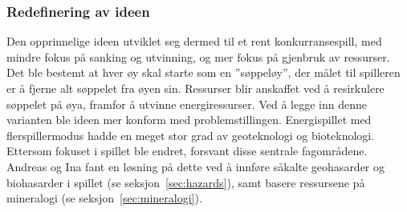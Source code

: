 \subsubsection{Redefinering av ideen}
Den opprinnelige ideen utviklet seg dermed til et rent konkurransespill,
med mindre fokus på sanking og utvinning, og mer fokus på gjenbruk av ressurser. 
Det ble bestemt at hver øy skal starte som en ''søppeløy'', der målet til
spilleren er å fjerne alt søppelet fra øyen sin. Ressurser blir anskaffet
ved å resirkulere søppelet på øya, framfor å utvinne energiressurser. Ved å legge inn denne varianten ble ideen mer konform med problemstillingen. Energispillet med
flerspillermodus hadde en meget stor grad av geoteknologi og
bioteknologi. Ettersom fokuset i spillet ble endret,
forsvant disse sentrale fagområdene. Andreas og Ina fant en løsning
på dette ved å innføre såkalte geohasarder og biohasarder i spillet (se
seksjon~\ref{sec:hazards}), samt basere ressursene på mineralogi (se seksjon~\ref{sec:mineralogi}).



